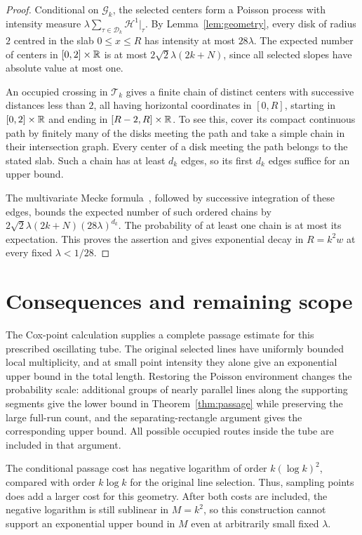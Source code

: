 \documentclass[11pt,letterpaper]{article}
\begin{document}
\begin{proof}
Conditional on $\mathcal G_k$, the selected centers form a Poisson process with intensity measure $\lambda\sum_{\tau\in\mathcal D_k}\mathcal H^1|_\tau$. By Lemma~\ref{lem:geometry}, every disk of radius $2$ centred in the slab $0\le x\le R$ has intensity at most $28\lambda$. The expected number of centers in $[0,2]\times\mathbb R$ is at most $2\sqrt2\lambda(2k+N)$, since all selected slopes have absolute value at most one.

An occupied crossing in $\mathcal T_k$ gives a finite chain of distinct centers with successive distances less than $2$, all having horizontal coordinates in $[0,R]$, starting in $[0,2]\times\mathbb R$ and ending in $[R-2,R]\times\mathbb R$. To see this, cover its compact continuous path by finitely many of the disks meeting the path and take a simple chain in their intersection graph. Every center of a disk meeting the path belongs to the stated slab. Such a chain has at least $d_k$ edges, so its first $d_k$ edges suffice for an upper bound.

The multivariate Mecke formula~\cite[Theorem~4.4]{LP17}, followed by successive integration of these edges, bounds the expected number of such ordered chains by $2\sqrt2\lambda(2k+N)(28\lambda)^{d_k}$. The probability of at least one chain is at most its expectation. This proves the assertion and gives exponential decay in $R=k^2w$ at every fixed $\lambda<1/28$.
\end{proof}

\section{Consequences and remaining scope}

The Cox-point calculation supplies a complete passage estimate for this prescribed oscillating tube. The original selected lines have uniformly bounded local multiplicity, and at small point intensity they alone give an exponential upper bound in the total length. Restoring the Poisson environment changes the probability scale: additional groups of nearly parallel lines along the supporting segments give the lower bound in Theorem~\ref{thm:passage} while preserving the large full-run count, and the separating-rectangle argument gives the corresponding upper bound. All possible occupied routes inside the tube are included in that argument.

The conditional passage cost has negative logarithm of order $k(\log k)^2$, compared with order $k\log k$ for the original line selection. Thus, sampling points does add a larger cost for this geometry. After both costs are included, the negative logarithm is still sublinear in $M=k^2$, so this construction cannot support an exponential upper bound in $M$ even at arbitrarily small fixed $\lambda$.
\end{document}
